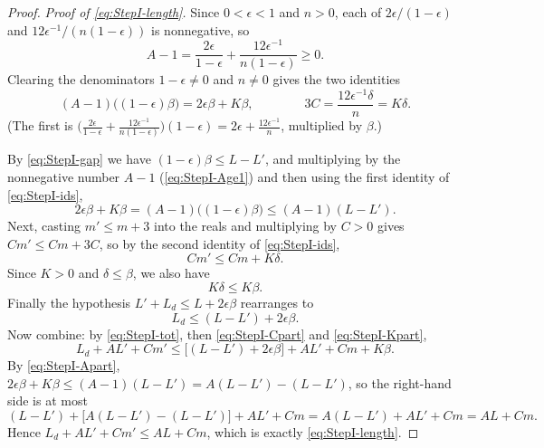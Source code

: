 \begin{proof}
  \emph{Proof of \eqref{eq:StepI-length}.} Since $0<\epsilon<1$ and $n>0$, each of
  $2\epsilon/(1-\epsilon)$ and $12\epsilon^{-1}/(n(1-\epsilon))$ is nonnegative, so
  \begin{equation}
    \label{eq:StepI-Age1}
    A - 1 = \frac{2\epsilon}{1-\epsilon} + \frac{12\epsilon^{-1}}{n(1-\epsilon)} \ge 0
    .
  \end{equation}
  Clearing the denominators $1-\epsilon\ne0$ and $n\ne0$ gives the two identities
  \begin{equation}
    \label{eq:StepI-ids}
    (A-1)\bigl((1-\epsilon)\beta\bigr) = 2\epsilon\beta + K\beta
    , \qquad\qquad
    3C = \frac{12\epsilon^{-1}\delta}{n} = K\delta
    .
  \end{equation}
  (The first is $\bigl(\tfrac{2\epsilon}{1-\epsilon}+\tfrac{12\epsilon^{-1}}{n(1-\epsilon)}\bigr)
  (1-\epsilon) = 2\epsilon + \tfrac{12\epsilon^{-1}}{n}$, multiplied by $\beta$.)

  By \eqref{eq:StepI-gap} we have $(1-\epsilon)\beta \le L - L'$, and multiplying by the
  nonnegative number $A-1$ (\eqref{eq:StepI-Age1}) and then using the first identity of
  \eqref{eq:StepI-ids},
  \begin{equation}
    \label{eq:StepI-Apart}
    2\epsilon\beta + K\beta = (A-1)\bigl((1-\epsilon)\beta\bigr) \le (A-1)(L-L')
    .
  \end{equation}
  Next, casting $m'\le m+3$ into the reals and multiplying by $C>0$ gives
  $C m' \le C m + 3C$, so by the second identity of \eqref{eq:StepI-ids},
  \begin{equation}
    \label{eq:StepI-Cpart}
    C m' \le C m + K\delta
    .
  \end{equation}
  Since $K>0$ and $\delta\le\beta$, we also have
  \begin{equation}
    \label{eq:StepI-Kpart}
    K\delta \le K\beta
    .
  \end{equation}
  Finally the hypothesis $L'+L_d \le L + 2\epsilon\beta$ rearranges to
  \begin{equation}
    \label{eq:StepI-tot}
    L_d \le (L-L') + 2\epsilon\beta
    .
  \end{equation}
  Now combine: by \eqref{eq:StepI-tot}, then \eqref{eq:StepI-Cpart} and \eqref{eq:StepI-Kpart},
  \[
    L_d + A L' + C m'
      \le \bigl[(L-L') + 2\epsilon\beta\bigr] + A L' + C m + K\beta
    .
  \]
  By \eqref{eq:StepI-Apart}, $2\epsilon\beta + K\beta \le (A-1)(L-L') = A(L-L') - (L-L')$, so the
  right-hand side is at most
  \[
    (L-L') + \bigl[A(L-L') - (L-L')\bigr] + A L' + C m
      = A(L-L') + A L' + C m
      = A L + C m
    .
  \]
  Hence $L_d + A L' + C m' \le A L + C m$, which is exactly \eqref{eq:StepI-length}.
\end{proof}
